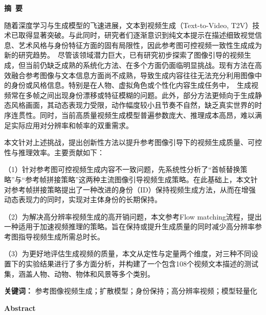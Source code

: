 \cleardoublepage
\begin{center}
    \bfseries {} 摘~要
\end{center}

随着深度学习与生成模型的飞速进展，文本到视频生成（Text-to-Video, T2V）技术已取得显著突破。与此同时，研究者们逐渐意识到纯文本提示在描述细致视觉信息、艺术风格与身份特征方面的固有局限性，因此参考图可控视频一致性生成成为新的研究趋势。\
尽管该领域潜力巨大，已有研究初步探索了图像引导的视频生成，但当前仍缺乏成熟的系统化方法、在多个方面仍面临明显挑战。现有方法在高效融合参考图像与文本信息方面尚不成熟，导致生成内容往往无法充分利用图像中的身份或风格信息。特别是在人物、虚拟角色或个性化内容生成任务中，\
生成视频常在多帧之间出现身份漂移或特征模糊的问题。此外，部分方法更倾向于生成静态风格画面，其动态表现力受限，动作幅度较小且节奏不自然，缺乏真实世界的时序连贯性。同时，当前高质量视频生成模型普遍参数庞大、推理成本高昂，难以满足实际应用对分辨率和帧率的双重需求。

本文针对上述挑战，提出创新性方法以提升参考图像引导下的视频生成质量、可控性与推理效率。主要贡献如下：

（1）针对参考图可控视频生成内容不一致问题，先系统性分析了“首帧替换策略”与“参考帧拼接策略”这两种主流图像引导视频生成策略。在此基础上，本文针对参考帧拼接策略提出了一种改进的身份（ID）保持视频生成方法，从而在增强动态表现力的同时，实现对主体身份的长期保持。

（2）为解决高分辨率视频生成的高开销问题，本文参考Flow matching流程，提出一种适用于加速视频推理的策略。旨在保持或提升生成质量的同时减少高分辨率参考图指导视频生成所需总时长。

（3）为更好地评估生成视频的质量，本文从定性与定量两个维度，对三种不同设置下的实验结果进行了多方面分析，并构建了一个包含108个视频文本描述的测试集，涵盖人物、动物、物体和风景等多个类别。

\vspace{0.5cm} %

\noindent
\textbf{关键词：} 参考图像视频生成；扩散模型；身份保持；高分辨率视频；模型轻量化
\cleardoublepage{}
\begin{center}
    \bfseries {} Abstract
\end{center}


